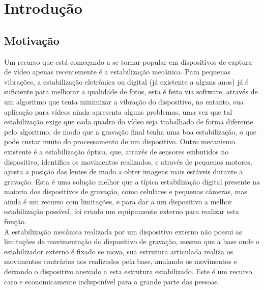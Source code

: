 
\chapter{Introdução}\label{cap:introducao}

\section{Motivação}
Um recurso que está começando a se tornar popular em dispositivos de captura de vídeo apenas recentemente é a estabilização mecânica. Para pequenas vibrações, a estabilização eletrônica ou digital (já existente a alguns anos) já é suficiente para melhorar a qualidade de fotos, esta é feita via software, através de um algoritmo que tenta minimizar a vibração do dispositivo, no entanto, sua aplicação para vídeos ainda apresenta alguns problemas, uma vez que tal estabilização exige que cada quadro do vídeo seja trabalhado de forma diferente pelo algoritmo, de modo que a gravação final tenha uma boa estabilização, o que pode custar muito do processamento de um dispositivo. Outro mecanismo existente é a estabilização óptica, que, através de sensores embutidos no dispositivo, identifica os movimentos realizados, e através de pequenos motores, ajusta a posição das lentes de modo a obter imagens mais estáveis durante a gravação. Esta é uma solução melhor que a típica estabilização digital presente na maioria dos dispositivos de gravação, como celulares e pequenas câmeras, mas ainda é um recurso com limitações, e para dar a um dispositivo a melhor estabilização possível, foi criado um equipamento externo para realizar esta função.\\
\indent A estabilização mecânica realizada por um dispositivo externo não possui as limitações de movimentação do dispositivo de gravação, mesmo que a base onde o estabilizador externo é fixado se mova, sua estrutura articulada realiza os movimentos contrários aos realizados pela base, anulando os movimentos e deixando o dispositivo anexado a esta estrutura estabilizado. Este é um recurso caro e economicamente indisponível para a grande parte das pessoas.

